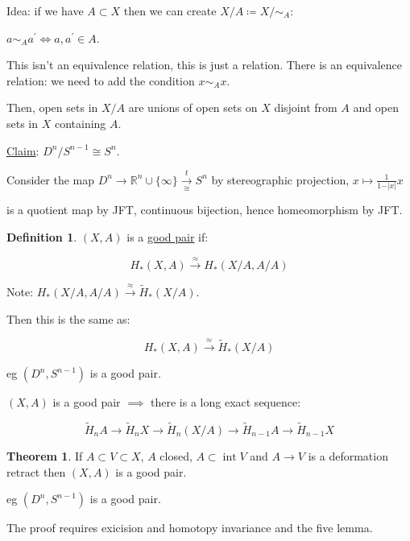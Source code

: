 \documentclass{article}
\theoremstyle{definition}
\newtheorem*{definition}{Definition}
\newtheorem{theorem}{Theorem}
\begin{document}
    Idea: if we have \(A \subset X\) then we can create \(X / A \coloneqq X / \sim_A\):

    \(a \sim_A a^{\prime} \iff a, a^{\prime} \in A\).

    This isn't an equivalence relation, this is just a relation. There is an equivalence relation: we need to add the condition \(x \sim_A x\).

    Then, open sets in \(X / A\) are unions of open sets on \(X\) disjoint from \(A\) and open sets in \(X\) containing \(A\).

    \underline{Claim}: \(D^n / S^{n-1} \cong S^n\).

    Consider the map \(D^n \to \mathbb{R}^n \cup \{ \infty \} \xrightarrow[\cong]{t} S^n\) by stereographic projection, \(x \mapsto \frac{1}{1-\vert x \vert} x\) 

    \begin{center}
    \end{center} 

    is a quotient map by JFT, continuous bijection, hence homeomorphism by JFT.

    \begin{definition}
        \((X,A)\) is a \underline{good pair} if:

        \[
            H_{\ast} (X, A) \xrightarrow{\approx} H_{\ast} (X / A, A / A)
        \]
    \end{definition}

    Note: \(H_{\ast} (X / A, A / A) \xrightarrow{\approx} \widetilde{H}_{\ast} (X / A)\).

    Then this is the same as:

    \[
        H_{\ast} (X, A) \xrightarrow{\approx} \widetilde{H}_{\ast} (X / A)
    \]

    eg \((D^n, S^{n-1})\) is a good pair.

    \((X,A)\) is a good pair \(\implies\) there is a long exact sequence:

    \[
        \widetilde{H}_n A \to \widetilde{H}_n X \to \widetilde{H}_n(X / A) \to \widetilde{H}_{n-1} A \to \widetilde{H}_{n-1} X 
    \]

    \begin{theorem}
        If \(A \subset V \subset X\), \(A\) closed, \(A \subset \operatorname{int} V\) and \(A \to V\) is a deformation retract then \((X,A)\) is a good pair.
    \end{theorem}

    eg \((D^n, S^{n-1})\) is a good pair.

    The proof requires exicision and homotopy invariance and the five lemma.
\end{document}
